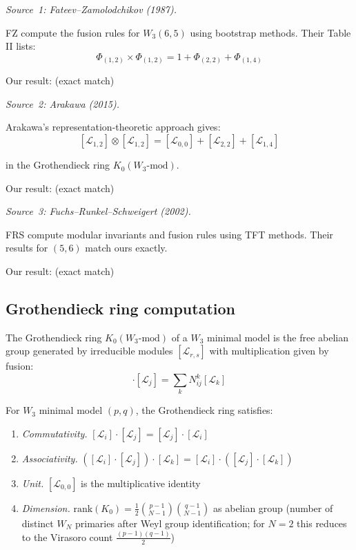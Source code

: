 \begin{verification}\label{verif:w3-5-6-literature}

\emph{Source~1: Fateev--Zamolodchikov (1987).}

FZ compute the fusion rules for $W_3(6,5)$ using bootstrap methods. Their Table II
lists:
\[\Phi_{(1,2)} \times \Phi_{(1,2)} = 1 + \Phi_{(2,2)} + \Phi_{(1,4)}\]

Our result: (exact match)

\emph{Source~2: Arakawa (2015).}

Arakawa's representation-theoretic approach gives:
\[[\mathcal{L}_{1,2}] \otimes [\mathcal{L}_{1,2}] = [\mathcal{L}_{0,0}]
+ [\mathcal{L}_{2,2}] + [\mathcal{L}_{1,4}]\]

in the Grothendieck ring $K_0(W_3\text{-mod})$.

Our result: (exact match)

\emph{Source~3: Fuchs--Runkel--Schweigert (2002).}

FRS compute modular invariants and fusion rules using TFT methods. Their results
for $(5,6)$ match ours exactly.

Our result: (exact match)
\end{verification}

\subsection{Grothendieck ring computation}
\label{subsec:grothendieck-ring}

\begin{definition}\label{def:grothendieck-w3}
The Grothendieck ring $K_0(W_3\text{-mod})$ of a $W_3$ minimal model is the
free abelian group generated by irreducible modules $[\mathcal{L}_{r,s}]$ with
multiplication given by fusion:
\begin{equation}
[\mathcal{L}_i] \cdot [\mathcal{L}_j] = \sum_k N_{ij}^k [\mathcal{L}_k]
\end{equation}
\end{definition}

\begin{theorem}\label{thm:grothendieck-structure}
For $W_3$ minimal model $(p,q)$, the Grothendieck ring satisfies:
\begin{enumerate}
\item \emph{Commutativity.} $[\mathcal{L}_i] \cdot [\mathcal{L}_j] =
[\mathcal{L}_j] \cdot [\mathcal{L}_i]$
\item \emph{Associativity.} $([\mathcal{L}_i] \cdot [\mathcal{L}_j]) \cdot
[\mathcal{L}_k] = [\mathcal{L}_i] \cdot ([\mathcal{L}_j] \cdot [\mathcal{L}_k])$
\item \emph{Unit.} $[\mathcal{L}_{0,0}]$ is the multiplicative identity
\item \emph{Dimension.} $\text{rank}(K_0) = \frac{1}{2}\binom{p-1}{N-1}\binom{q-1}{N-1}$ as abelian group (number of distinct $W_N$ primaries after Weyl group identification; for $N = 2$ this reduces to the Virasoro count $\frac{(p-1)(q-1)}{2}$)
\end{enumerate}
\end{theorem}

